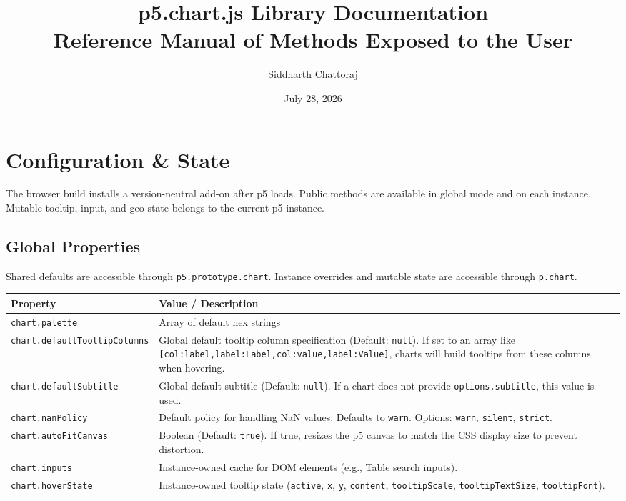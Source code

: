\documentclass[10pt, a4paper]{article}
\title{\textbf{p5.chart.js Library Documentation}\\ \large Reference Manual of Methods Exposed to the User}
\author{Siddharth Chattoraj}
\date{July 28, 2026}
\begin{document}
\maketitle
\tableofcontents
\newpage

\section{Configuration \& State}

The browser build installs a version-neutral add-on after p5 loads. Public methods are available in global mode and on each instance. Mutable tooltip, input, and geo state belongs to the current p5 instance.

\subsection{Global Properties}
Shared defaults are accessible through \texttt{p5.prototype.chart}. Instance overrides and mutable state are accessible through \texttt{p.chart}.

\begin{longtable}{p{5cm} p{10cm}}
\toprule
\textbf{Property} & \textbf{Value / Description} \\
\midrule
\texttt{chart.palette} & Array of default hex strings\\
\texttt{chart.defaultTooltipColumns} & Global default tooltip column specification (Default: \texttt{null}). If set to an array like \texttt{[{col:label,label:Label},{col:value,label:Value}]}, charts will build tooltips from these columns when hovering. \\
\texttt{chart.defaultSubtitle} & Global default subtitle (Default: \texttt{null}). If a chart does not provide \texttt{options.subtitle}, this value is used. \\
\texttt{chart.nanPolicy} & Default policy for handling NaN values. Defaults to \texttt{warn}. Options: \texttt{warn}, \texttt{silent}, \texttt{strict}. \\
\texttt{chart.autoFitCanvas} & Boolean (Default: \texttt{true}). If true, resizes the p5 canvas to match the CSS display size to prevent distortion. \\
\texttt{chart.inputs} & Instance-owned cache for DOM elements (e.g., Table search inputs). \\
\texttt{chart.hoverState} & Instance-owned tooltip state (\texttt{active}, \texttt{x}, \texttt{y}, \texttt{content}, \texttt{tooltipScale}, \texttt{tooltipTextSize}, \texttt{tooltipFont}). \\
\bottomrule
\end{longtable}
\end{document}
